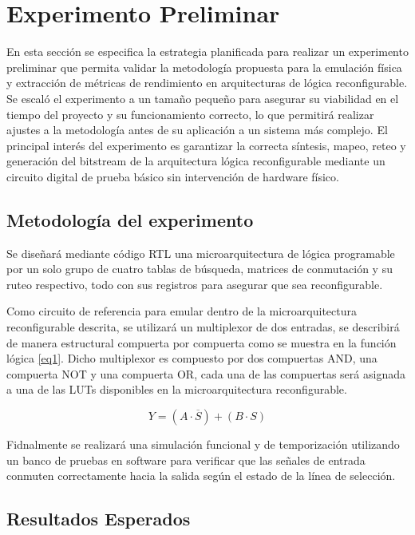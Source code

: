 \chapter{Experimento Preliminar}
\label{ch:Experimento}

En esta sección se especifica la estrategia planificada para realizar un 
experimento preliminar que permita validar la metodología propuesta para 
la emulación física y extracción de métricas de rendimiento en 
arquitecturas de lógica reconfigurable. Se escaló el experimento a un 
tamaño pequeño para asegurar su viabilidad en el tiempo del proyecto y 
su funcionamiento correcto, lo que permitirá realizar ajustes a la 
metodología antes de su aplicación a un sistema más complejo. El 
principal interés del experimento es garantizar la correcta síntesis, 
mapeo, reteo y generación del bitstream de la arquitectura lógica 
reconfigurable mediante un circuito digital de prueba básico sin 
intervención de hardware físico.

\section{Metodología del experimento}

Se diseñará mediante código RTL una microarquitectura de lógica 
programable por un solo grupo de cuatro tablas de búsqueda, 
matrices de conmutación y su ruteo respectivo, todo con sus registros 
para asegurar que sea reconfigurable.

Como circuito de referencia para emular dentro de la microarquitectura 
reconfigurable descrita, se utilizará un multiplexor de dos entradas, 
se describirá de manera estructural compuerta por compuerta como se 
muestra en la función lógica \ref{eq1}. Dicho multiplexor es compuesto 
por dos compuertas AND, una compuerta NOT y una compuerta OR, cada una 
de las compuertas será asignada a una de las LUTs disponibles en la 
microarquitectura reconfigurable.

\begin{equation}
	\label{eq1}
	Y = (A \cdot \overline{S}) + (B \cdot S)
\end{equation}

Fidnalmente se realizará una simulación funcional y de temporización 
utilizando un banco de pruebas en software para verificar que las 
señales de entrada conmuten correctamente hacia la salida según el 
estado de la línea de selección.

\section{Resultados Esperados}

